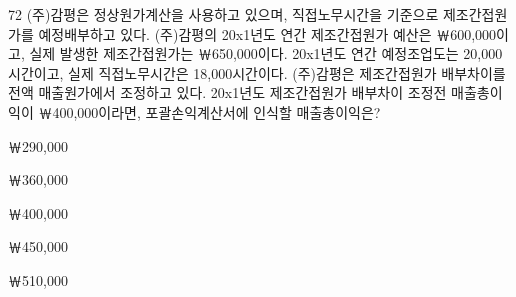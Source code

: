 \begin{question}{72}
(주)감평은 정상원가계산을 사용하고 있으며, 직접노무시간을 기준으로 제조간접원가를 예정배부하고 있다. (주)감평의 20x1년도 연간 제조간접원가 예산은 ￦600,000이고, 실제 발생한 제조간접원가는 ￦650,000이다. 20x1년도 연간 예정조업도는 20,000시간이고, 실제 직접노무시간은 18,000시간이다. (주)감평은 제조간접원가 배부차이를 전액 매출원가에서 조정하고 있다. 20x1년도 제조간접원가 배부차이 조정전 매출총이익이 ￦400,000이라면, 포괄손익계산서에 인식할 매출총이익은?
\begin{choices}
  \item ￦290,000
  \item ￦360,000
  \item ￦400,000
  \item ￦450,000
  \item ￦510,000
\end{choices}
\end{question}
